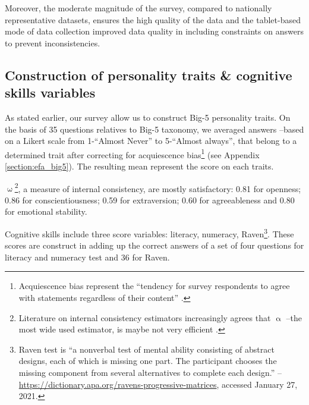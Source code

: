 \documentclass[a4paper, 11pt, onecolumn]{article}
\begin{document}
Moreover, the moderate magnitude of the survey, compared to nationally representative datasets, ensures the high quality of the data and the tablet-based mode of data collection improved data quality in including constraints on answers to prevent inconsistencies. 




	\subsection{Construction of personality traits \& cognitive skills variables }

As stated earlier, our survey allow us to construct Big-5 personality traits.
On the basis of 35 questions relatives to Big-5 taxonomy, we averaged answers --based on a  Likert scale from 1-``Almost Never'' to 5-``Almost always'', that belong to a determined trait after correcting for acquiescence bias\footnote{Acquiescence bias represent the ``tendency for survey respondents to agree with statements regardless of their content'' \citep{Lavrakas2008}.} (see Appendix \ref{section:efa_big5}).
The resulting mean represent the score on each traits.

\cite{McDonald1999} $\upomega$\footnote{Literature on internal consistency estimators increasingly agrees that \cite{Cronbach1951} $\upalpha$ --the most wide used estimator, is maybe not very efficient \citep{Bourque2019, TrizanoHermosilla2016}.}, a measure of internal consistency, are mostly satisfactory: 0.81 for openness; 0.86 for conscientiousness; 0.59 for extraversion; 0.60 for agreeableness and 0.80 for emotional stability.

Cognitive skills include three score variables: literacy, numeracy, Raven\footnote{Raven test is ``a nonverbal test of mental ability consisting of abstract designs, each of which is missing one part. The participant chooses the missing component from several alternatives to complete each design.'' -- \url{https://dictionary.apa.org/ravens-progressive-matrices}, accessed January 27, 2021.}.
These scores are construct in adding up the correct answers of a set of four questions for literacy and numeracy test and 36 for Raven.
\end{document}

